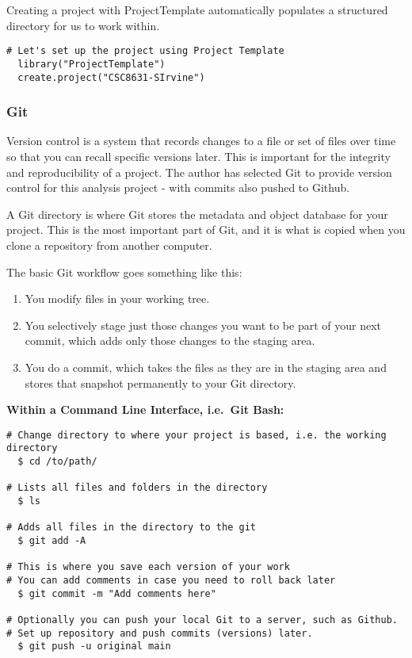 \documentclass[
]{article}
\begin{document}
Creating a project with ProjectTemplate automatically populates a
structured directory for us to work within.

\begin{verbatim}
# Let's set up the project using Project Template
  library("ProjectTemplate")
  create.project("CSC8631-SIrvine")
\end{verbatim}

\hypertarget{git}{%
\subsubsection{Git}\label{git}}

Version control is a system that records changes to a file or set of
files over time so that you can recall specific versions later. This is
important for the integrity and reproducibility of a project. The author
has selected Git to provide version control for this analysis project -
with commits also pushed to Github.

\newpage

A Git directory is where Git stores the metadata and object database for
your project. This is the most important part of Git, and it is what is
copied when you clone a repository from another computer.

The basic Git workflow goes something like this:

\begin{enumerate}
\def\labelenumi{\arabic{enumi}.}
\item
  You modify files in your working tree.
\item
  You selectively stage just those changes you want to be part of your
  next commit, which adds only those changes to the staging area.
\item
  You do a commit, which takes the files as they are in the staging area
  and stores that snapshot permanently to your Git directory.
\end{enumerate}

\textbf{Within a Command Line Interface, i.e.~Git Bash:}

\begin{verbatim}
# Change directory to where your project is based, i.e. the working directory
  $ cd /to/path/ 

# Lists all files and folders in the directory
  $ ls 
  
# Adds all files in the directory to the git
  $ git add -A 
  
# This is where you save each version of your work 
# You can add comments in case you need to roll back later
  $ git commit -m "Add comments here" 

# Optionally you can push your local Git to a server, such as Github. 
# Set up repository and push commits (versions) later.
  $ git push -u original main
\end{verbatim}
\end{document}
